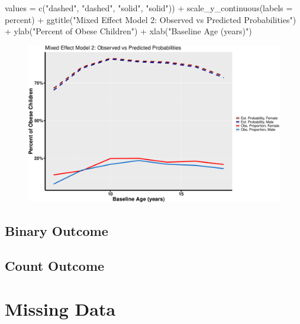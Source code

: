 \documentclass[
  letterpaper,
  DIV=11,
  numbers=noendperiod]{scrreprt}
\newenvironment{Shaded}{\begin{snugshade}}{\end{snugshade}}
\newcommand{\AttributeTok}[1]{\textcolor[rgb]{0.40,0.45,0.13}{#1}}
\newcommand{\FunctionTok}[1]{\textcolor[rgb]{0.28,0.35,0.67}{#1}}
\newcommand{\NormalTok}[1]{\textcolor[rgb]{0.00,0.23,0.31}{#1}}
\newcommand{\SpecialCharTok}[1]{\textcolor[rgb]{0.37,0.37,0.37}{#1}}
\newcommand{\StringTok}[1]{\textcolor[rgb]{0.13,0.47,0.30}{#1}}
\begin{document}
\begin{Shaded}
\begin{Highlighting}[]
    \AttributeTok{values =} \FunctionTok{c}\NormalTok{(}\StringTok{"dashed"}\NormalTok{, }\StringTok{"dashed"}\NormalTok{, }\StringTok{"solid"}\NormalTok{, }\StringTok{"solid"}\NormalTok{)) }\SpecialCharTok{+} \FunctionTok{scale\_y\_continuous}\NormalTok{(}\AttributeTok{labels =}\NormalTok{ percent) }\SpecialCharTok{+}
    \FunctionTok{ggtitle}\NormalTok{(}\StringTok{"Mixed Effect Model 2: Observed vs Predicted Probabilities"}\NormalTok{) }\SpecialCharTok{+} \FunctionTok{ylab}\NormalTok{(}\StringTok{"Percent of Obese Children"}\NormalTok{) }\SpecialCharTok{+}
    \FunctionTok{xlab}\NormalTok{(}\StringTok{"Baseline Age (years)"}\NormalTok{)}
\end{Highlighting}
\end{Shaded}

\begin{figure}[H]

{\centering \includegraphics{Longi_noncontinuous_files/figure-pdf/unnamed-chunk-24-1.pdf}

}

\end{figure}

\hypertarget{binary-outcome}{%
\section{Binary Outcome}\label{binary-outcome}}

\hypertarget{count-outcome}{%
\section{Count Outcome}\label{count-outcome}}

\hypertarget{sec-longi-missingdata}{%
\chapter{Missing Data}\label{sec-longi-missingdata}}



\printindex
\end{document}
